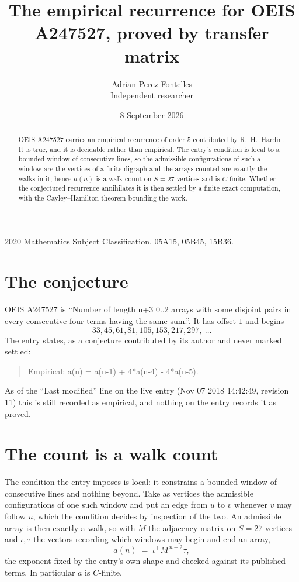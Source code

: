 \documentclass[11pt,a4paper]{article}
\title{The empirical recurrence for OEIS A247527, proved by transfer matrix}
\author{Adrian Perez Fontelles\\ \small Independent researcher}
\date{8 September 2026}
\theoremstyle{plain}
\theoremstyle{definition}
\begin{document}
\maketitle

\begin{abstract}
OEIS A247527 carries an empirical recurrence of order $5$ contributed by R.~H.~Hardin. It is
true, and it is decidable rather than empirical. The entry's condition is local to a bounded window of consecutive lines, so
the admissible configurations of such a window are the vertices of a finite digraph and the
arrays counted are exactly the walks in it; hence $a(n)$ is a walk count on $S=27$ vertices
and is $C$-finite. Whether the conjectured recurrence annihilates it is then settled by a
finite exact computation, with the Cayley--Hamilton theorem bounding the work.
\end{abstract}

\noindent\small 2020 Mathematics Subject Classification. 05A15, 05B45, 15B36.\normalsize

\section{The conjecture}

OEIS A247527 is ``Number of length n+3 0..2 arrays with some disjoint pairs in every consecutive four terms having the same sum.''. It has offset $1$ and begins
\[
33, 45, 61, 81, 105, 153, 217, 297,\ \dots
\]
The entry states, as a conjecture contributed by its author and never marked settled:
\begin{quote}
Empirical: a(n) = a(n-1) + 4*a(n-4) - 4*a(n-5).
\end{quote}
As of the ``Last modified'' line on the live entry (Nov 07 2018 14:42:49, revision 11) this is still
recorded as empirical, and nothing on the entry records it as proved.

\section{The count is a walk count}

The condition the entry imposes is local: it constrains a bounded window of consecutive lines and nothing beyond. Take as
vertices the admissible configurations of one such window and put an edge from $u$ to $v$
whenever $v$ may follow $u$, which the condition decides by inspection of the two. An
admissible array is then exactly a walk, so with $M$ the adjacency matrix on $S=27$ vertices
and $\iota,\tau$ the vectors recording which windows may begin and end an array,
\[
a(n)\;=\;\iota^{\!\top}M^{\,n+2}\tau ,
\]
the exponent fixed by the entry's own shape and checked against its published terms. In
particular $a$ is $C$-finite.
\end{document}
